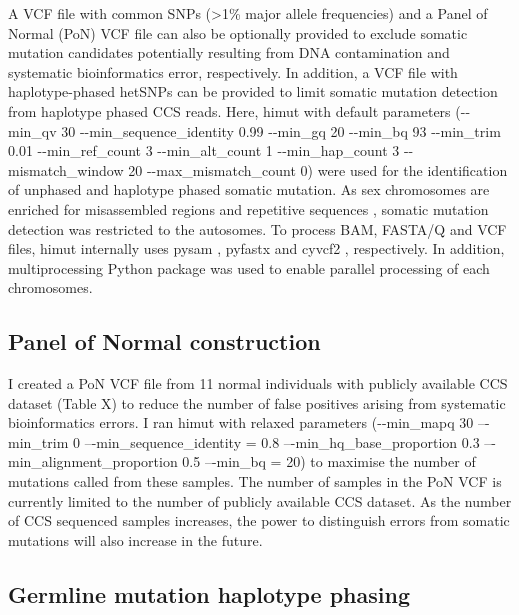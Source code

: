 A VCF file with common SNPs (>1\% major allele frequencies) and a Panel of Normal (PoN) VCF file can also be optionally provided to exclude somatic mutation candidates potentially resulting from DNA contamination and systematic bioinformatics error, respectively. In addition, a VCF file with haplotype-phased hetSNPs can be provided to limit somatic mutation detection from haplotype phased CCS reads. Here, himut with default parameters (-{}-min\_qv 30 -{}-min\_sequence\_identity 0.99 -{}-min\_gq 20 -{}-min\_bq 93 -{}-min\_trim 0.01 -{}-min\_ref\_count 3 -{}-min\_alt\_count 1 -{}-min\_hap\_count 3 -{}-mismatch\_window 20 -{}-max\_mismatch\_count 0) were used for the identification of unphased and haplotype phased somatic mutation. As sex chromosomes are enriched for misassembled regions and repetitive sequences \cite{}, somatic mutation detection was restricted to the autosomes. To process BAM, FASTA/Q and VCF files, himut internally uses pysam \cite{pysam}, pyfastx \cite{Du2021-ya} and cyvcf2 \cite{Pedersen2017-ld}, respectively. In addition, multiprocessing Python package \cite{} was used to enable parallel processing of each chromosomes. 

\subsection{Panel of Normal construction}

I created a PoN VCF file from 11 normal individuals with publicly available CCS dataset (Table X) to reduce the number of false positives arising from systematic bioinformatics errors. I ran himut with relaxed parameters (-{}-min\_mapq 30 –{}-min\_trim 0 –{}-min\_sequence\_identity = 0.8 –{}-min\_hq\_base\_proportion 0.3 –{}-min\_alignment\_proportion 0.5 –{}-min\_bq = 20) to maximise the number of mutations called from these samples. The number of samples in the PoN VCF is currently limited to the number of publicly available CCS dataset. As the number of CCS sequenced samples increases, the power to distinguish errors from somatic mutations will also increase in the future.

\subsection{Germline mutation haplotype phasing}

